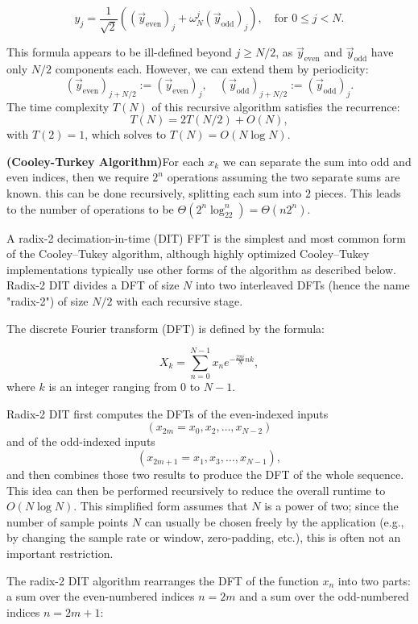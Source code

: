 \begin{equation}
    y_j = \frac{1}{\sqrt{2}} \left( (\vec{y}_{\text{even}})_j + \omega_N^j (\vec{y}_{\text{odd}})_j \right), \quad \text{for } 0 \leq j < N.
\end{equation}

This formula appears to be ill-defined beyond $j \geq N/2$, as $\vec{y}_{\text{even}}$ and $\vec{y}_{\text{odd}}$ have only $N/2$ components each. However, we can extend them by periodicity:
\[
    (\vec{y}_{\text{even}})_{j + N/2} := (\vec{y}_{\text{even}})_j, \quad
    (\vec{y}_{\text{odd}})_{j + N/2} := (\vec{y}_{\text{odd}})_j.
\]
The time complexity $T(N)$ of this recursive algorithm satisfies the recurrence:
\[
T(N) = 2T(N/2) + O(N),
\]
with $T(2)=1$, which solves to $T(N) = O(N \log N)$. 

\textbf{(Cooley-Turkey Algorithm)}For each $x_k$ we can separate the sum into odd and even indices, then we require $2^n$ operations assuming the two separate sums are known. this can be done recursively, splitting each sum into $2$ pieces. This leads to the number of operations to be $\Theta(2^n \log_22^n) = \Theta(n2^n)$.

    A radix-2 decimation-in-time (DIT) FFT is the simplest and most common form of the Cooley–Tukey algorithm, although highly optimized Cooley–Tukey implementations typically use other forms of the algorithm as described below. Radix-2 DIT divides a DFT of size \( N \) into two interleaved DFTs (hence the name "radix-2") of size \( N/2 \) with each recursive stage.

The discrete Fourier transform (DFT) is defined by the formula:

\[
X_k = \sum_{n=0}^{N-1} x_n e^{-\frac{2 \pi i}{N} n k},
\]
where \( k \) is an integer ranging from \( 0 \) to \( N-1 \).

Radix-2 DIT first computes the DFTs of the even-indexed inputs 
\[
(x_{2m} = x_0, x_2, \ldots, x_{N-2})
\]
and of the odd-indexed inputs 
\[
(x_{2m+1} = x_1, x_3, \ldots, x_{N-1}),
\]
and then combines those two results to produce the DFT of the whole sequence. This idea can then be performed recursively to reduce the overall runtime to \( O(N \log N) \). This simplified form assumes that \( N \) is a power of two; since the number of sample points \( N \) can usually be chosen freely by the application (e.g., by changing the sample rate or window, zero-padding, etc.), this is often not an important restriction.

The radix-2 DIT algorithm rearranges the DFT of the function \( x_n \) into two parts: a sum over the even-numbered indices \( n = 2m \) and a sum over the odd-numbered indices \( n = 2m + 1 \):

